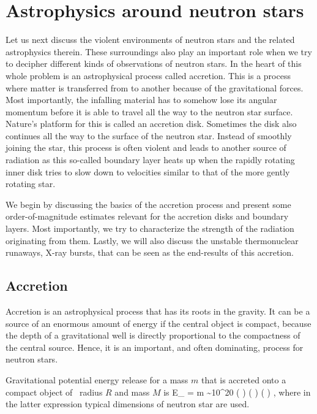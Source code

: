 \chapter{Astrophysics around neutron stars}

Let us next discuss the violent environments of neutron stars and the related astrophysics therein.
These surroundings also play an important role when we try to decipher different kinds of observations of neutron stars.
In the heart of this whole problem is an astrophysical process called accretion.
This is a process where matter is transferred from  to another because of the gravitational forces.
Most importantly, the infalling material has to somehow lose its angular momentum before it is able to travel all the way to the neutron star surface.
Nature's platform for this is called an accretion disk.
Sometimes the disk also continues all the way to the surface of the neutron star.
Instead of smoothly joining the star, this process is often violent and leads to another source of radiation as this so-called boundary layer heats up when the rapidly rotating inner disk tries to slow down to velocities similar to that of the more gently rotating star.

We begin by discussing the basics of the accretion process and present some order-of-magnitude estimates relevant for the accretion disks and boundary layers.
Most importantly, we try to characterize the strength of the radiation originating from them.
Lastly, we will also discuss the unstable thermonuclear runaways, X-ray bursts, that can be seen as the end-results of this accretion.


\section{Accretion}

Accretion is an astrophysical process that has its roots in the gravity. 
It can be a source of an enormous amount of energy if the central object is compact, because the depth of a gravitational well is directly proportional to the compactness of the central source.
Hence, it is an important, and often dominating, process for neutron stars.\cite[see e.g.,][]{FKR02}

Gravitational potential energy release for a mass $m$ that is accreted onto a compact object of  radius $R$ and  mass $M$ is
\be
\Delta E_{} = m  \sim 10^{20} \left(  \right) \left(  \right) \left(  \right) \erg,
\ee
where in the latter expression typical dimensions of neutron star are used.

